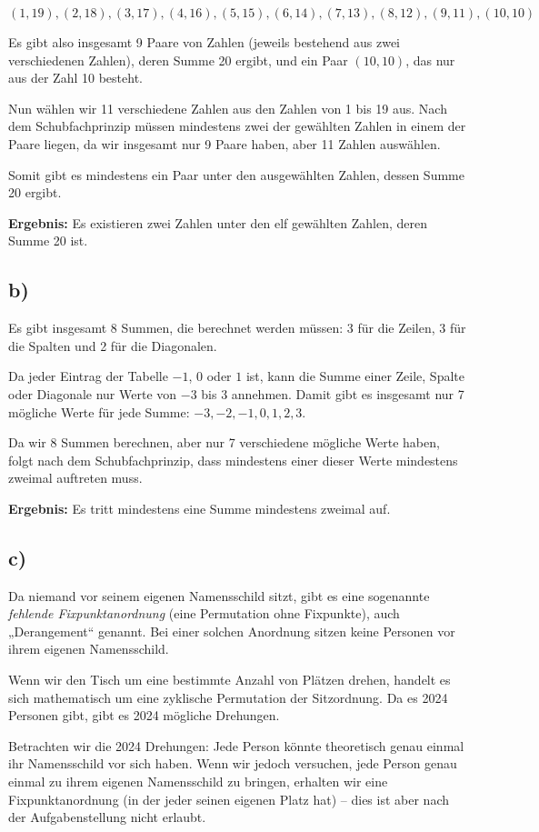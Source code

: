 \documentclass[a4paper]{scrartcl}
\newcounter{punkte}
\begin{document}
\[
(1, 19), (2, 18), (3, 17), (4, 16), (5, 15), (6, 14), (7, 13), (8, 12), (9, 11), (10, 10)
\]

Es gibt also insgesamt 9 Paare von Zahlen (jeweils bestehend aus zwei verschiedenen Zahlen), deren Summe 20 ergibt, und ein Paar \((10, 10)\), das nur aus der Zahl 10 besteht.

Nun wählen wir 11 verschiedene Zahlen aus den Zahlen von 1 bis 19 aus. Nach dem Schubfachprinzip müssen mindestens zwei der gewählten Zahlen in einem der Paare liegen, da wir insgesamt nur 9 Paare haben, aber 11 Zahlen auswählen.

Somit gibt es mindestens ein Paar unter den ausgewählten Zahlen, dessen Summe 20 ergibt.

\textbf{Ergebnis:} Es existieren zwei Zahlen unter den elf gewählten Zahlen, deren Summe 20 ist.
\subsection*{b)}
Es gibt insgesamt 8 Summen, die berechnet werden müssen: 3 für die Zeilen, 3 für die Spalten und 2 für die Diagonalen.

Da jeder Eintrag der Tabelle \(-1\), \(0\) oder \(1\) ist, kann die Summe einer Zeile, Spalte oder Diagonale nur Werte von \(-3\) bis \(3\) annehmen. Damit gibt es insgesamt nur 7 mögliche Werte für jede Summe: \(-3, -2, -1, 0, 1, 2, 3\).

Da wir 8 Summen berechnen, aber nur 7 verschiedene mögliche Werte haben, folgt nach dem Schubfachprinzip, dass mindestens einer dieser Werte mindestens zweimal auftreten muss.

\textbf{Ergebnis:} Es tritt mindestens eine Summe mindestens zweimal auf.
\subsection*{c)}
Da niemand vor seinem eigenen Namensschild sitzt, gibt es eine sogenannte \emph{fehlende Fixpunktanordnung} (eine Permutation ohne Fixpunkte), auch „Derangement“ genannt. Bei einer solchen Anordnung sitzen keine Personen vor ihrem eigenen Namensschild.

Wenn wir den Tisch um eine bestimmte Anzahl von Plätzen drehen, handelt es sich mathematisch um eine zyklische Permutation der Sitzordnung. Da es 2024 Personen gibt, gibt es 2024 mögliche Drehungen.

Betrachten wir die 2024 Drehungen: Jede Person könnte theoretisch genau einmal ihr Namensschild vor sich haben. Wenn wir jedoch versuchen, jede Person genau einmal zu ihrem eigenen Namensschild zu bringen, erhalten wir eine Fixpunktanordnung (in der jeder seinen eigenen Platz hat) – dies ist aber nach der Aufgabenstellung nicht erlaubt. 
\end{document}

